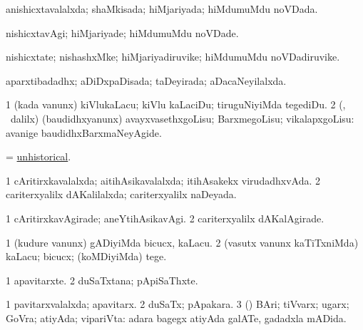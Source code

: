 \bentry
{} 
\gl{\gu}
\expl{}
\bmng
anishicxtavalalxda; shaMkisada; hiMjariyada; hiMdumuMdu noVDada. 
\emng
\eentry

\bentry
{} 
\gl{\kirxvi}
\expl{}
\bmng
nishicxtavAgi; hiMjariyade; hiMdumuMdu noVDade. 
\emng
\eentry

\bentry
{} 
\gl{\nA}
\expl{}
\bmng
nishicxtate; nishashxMke; hiMjariyadiruvike; hiMdumuMdu noVDadiruvike. 
\emng
\eentry

\bentry
{} 
\gl{\gu}
\expl{}
\bmng
aparxtibadadhx; aDiDxpaDisada; taDeyirada; aDacaNeyilalxda. 
\emng
\eentry

\bentry
{} 
\gl{\sakirx}
\expl{}
\bmng
\bnum
\num{1} (kada \mo vanunx) kiVlukaLacu; kiVlu kaLaciDu; tiruguNiyiMda tegediDu. 
\num{2} (\rUpa, \kanmu\ \BUkaq dalilx) (baudidhxyanunx) avayxvasethxgoLisu; BarxmegoLisu; vikalapxgoLisu:  avanige baudidhxBarxmaNeyAgide. 
\enum
\emng
\eentry

\bentry
{} 
\gl{\gu}
\expl{}
\bmng
= \hyperlink{unhistorical}{unhistorical}. 
\emng
\eentry

\bentry
{} 
\gl{\gu}
\expl{}
\bmng
\bnum
\num{1} cAritirxkavalalxda; aitihAsikavalalxda; itihAsakekx virudadhxvAda. 
\num{2} cariterxyalilx dAKalilalxda; cariterxyalilx naDeyada. 
\enum
\emng
\eentry

\bentry
{} 
\gl{\kirxvi}
\expl{}
\bmng
\bnum
\num{1} cAritirxkavAgirade; aneYtihAsikavAgi. 
\num{2} cariterxyalilx dAKalAgirade. 
\enum
\emng
\eentry

\bentry
{} 
\gl{\akirx}
\expl{}
\bmng
\bnum
\num{1} (kudure \mo vanunx) gADiyiMda bicucx, kaLacu. 
\num{2} (vasutx \mo vanunx kaTiTxniMda) kaLacu; bicucx; (koMDiyiMda) tege. 
\enum
\emng
\eentry

\bentry
{} 
\gl{\nA}
\expl{}
\bmng
\bnum
\num{1} apavitarxte. 
\num{2} duSaTxtana; pApiSaThxte. 
\enum
\emng
\eentry

\bentry
{} 
\gl{\gu}
\bmng
\bnum
\num{1} pavitarxvalalxda; apavitarx. 
\num{2} duSaTx; pApakara. 
\num{3} (\AmA) BAri; tiVvarx; ugarx; GoVra; atiyAda; vipariVta:  adara bagegx atiyAda galATe, gadadxla mADida. 
\enum
\emng
\eentry

